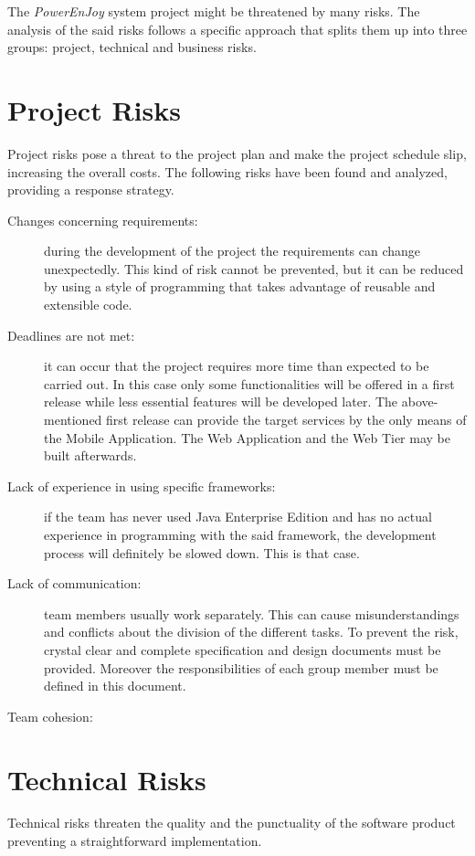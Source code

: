 
The \emph{PowerEnJoy} system project might be threatened by many risks. The analysis of the said risks follows a specific approach that splits them up into three groups: project, technical and business risks.

\section{Project Risks}
Project risks pose a threat to the project plan and make the project schedule slip, increasing the overall costs.
The following risks have been found and analyzed, providing a response strategy. 
\begin{description}
\item[Changes concerning requirements:] during the development of the project the requirements can change unexpectedly. This kind of risk cannot be prevented, but it can be reduced by using a style of programming that takes advantage of reusable and extensible code.
\item[Deadlines are not met:] it can occur that the project requires more time than expected to be carried out. In this case only some functionalities will be offered in a first release while less essential features will be developed later. The above-mentioned first release can provide the target services by the only means of the Mobile Application. The Web Application and the Web Tier may be built afterwards.
\item[Lack of experience in using specific frameworks:] if the team has never used Java Enterprise Edition and has no actual experience in programming with the said framework, the development process will definitely be slowed down. This is that case.
\item[Lack of communication:] team members usually work separately. This can cause misunderstandings and conflicts about the division of the different tasks. To prevent the risk, crystal clear and complete specification and design documents must be provided. Moreover the responsibilities of each group member must be defined in this document.
\item[Team cohesion:]
\end{description}

\section{Technical Risks}
Technical risks threaten the quality and the punctuality of the software product preventing a straightforward implementation.

